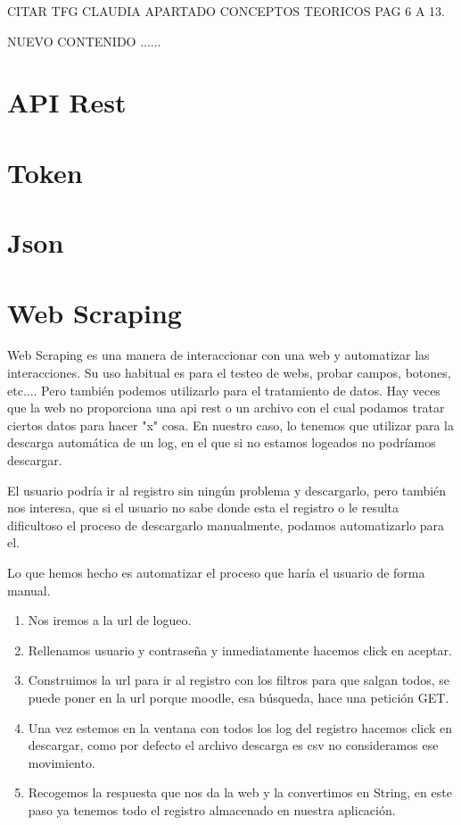 
CITAR TFG CLAUDIA APARTADO CONCEPTOS TEORICOS PAG 6 A 13.

NUEVO CONTENIDO ......

\section{API Rest}\label{api-rest}

\section{Token}\label{token}
\section{Json}\label{json}
\section{Web Scraping}\label{web-scraping}

Web Scraping es una manera de interaccionar con una web y automatizar las interacciones. Su uso habitual es para  el testeo de webs, probar campos, botones, etc.... Pero también podemos utilizarlo para el tratamiento de datos. Hay veces que la web no proporciona una api rest o un archivo con el cual podamos tratar ciertos datos para hacer "x" cosa. En nuestro caso, lo tenemos que utilizar para la descarga automática de un log, en el que si no estamos logeados no podríamos descargar.

El usuario podría ir al registro sin ningún problema y descargarlo, pero también nos interesa, que si el usuario no sabe donde esta el registro o le resulta dificultoso el proceso de descargarlo manualmente, podamos automatizarlo para el.
 
Lo que hemos hecho es automatizar el proceso que haría el usuario de forma manual. 
 \begin{enumerate}
 	\item 
 	Nos iremos a la url de logueo.
 	\item 
 	Rellenamos usuario y contraseña y inmediatamente hacemos click en aceptar.
 	\item 
 	Construimos la url para ir al registro con los filtros para que salgan todos, se puede poner en la url porque moodle, esa búsqueda, hace una petición GET.
 	\item 
 	Una vez estemos en la ventana con todos los log del registro hacemos click en descargar, como por defecto el archivo descarga es csv no consideramos ese movimiento.
 	\item 
 	Recogemos la respuesta que nos da la web y la convertimos en String, en este paso ya tenemos todo el registro almacenado en nuestra aplicación.
 \end{enumerate}
 
